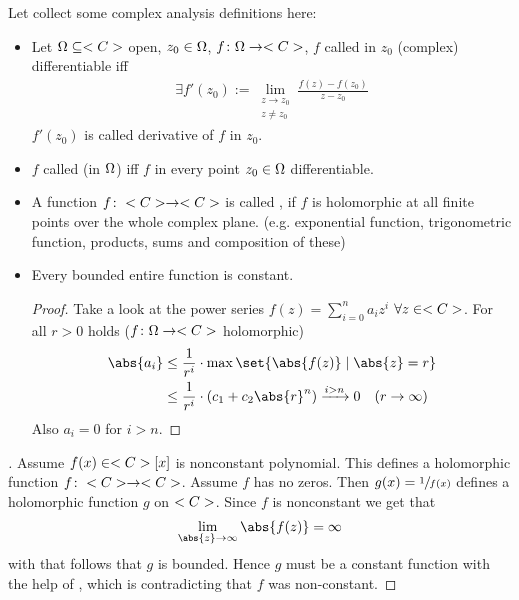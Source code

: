 \begin{*remark}
	Let collect some complex analysis definitions here:
	\begin{itemize}
		\item Let $\Omega \subseteq <C>$ open, $z_0 \in \Omega$, $f\colon \Omega \to <C>$, $f$ called in $z_0$ (complex) differentiable iff
		\begin{align*}
			\exists f'(z_0) := \lim_{\substack{z \to z_0\\ z \neq z_0}} \frac{f(z)-f(z_0)}{z-z_0}
		\end{align*}
		$f'(z_0)$ is called derivative of $f$ in $z_0$.
		\item $f$ called (in $\Omega$)  iff $f$ in every point $z_0 \in \Omega$ differentiable.
		\item A function $f\colon <C> \to <C>$ is called , if $f$ is holomorphic at all finite points over the whole complex plane. (e.g. exponential function, trigonometric function, products, sums and composition of these)
		\item {}
		\begin{proposition}
			Every bounded entire function is constant.
		\end{proposition}
	\begin{proof}
		Take a look at the power series $f(z) = \sum_{i=0}^n a_i z^i$ $\forall z \in <C>$. For all $r> 0$ holds ($f\colon \Omega \to <C>$ holomorphic)
		\begin{align*}
			\abs{a_i} &\le \frac{1}{r^i}\cdot \max\set{\abs{f(z)}\mid \abs{z} = r}\\
			&\le \frac{1}{r^i}\cdot (c_1 + c_2\abs{r}^n) \xrightarrow{i>n} 0 \quad (r \to \infty) 
		\end{align*}
		Also $a_i = 0$ for $i >n$.
	\end{proof}
	\end{itemize}
\end{*remark}
\begin{proof}[]
	Assume $f(x) \in <C>[x]$ is nonconstant polynomial. This defines a holomorphic function $f\colon <C> \to <C>$. Assume $f$ has no zeros. Then $g(x) = \sfrac{1}{f(x)}$ defines a holomorphic function $g$ on $<C>$. Since $f$ is nonconstant we get that
	\begin{align*}
		\lim_{\abs{z} \to \infty} \abs{f(z)} = \infty
	\end{align*}
	with that follows that $g$ is bounded. Hence $g$ must be a constant function with the help of , which is contradicting that $f$ was non-constant.
\end{proof}
